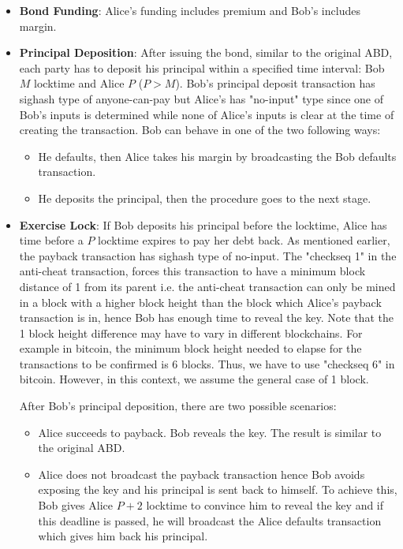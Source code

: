 \begin{itemize}
    \item \textbf{Bond Funding}: Alice's funding includes premium and Bob's includes margin.
    
    \item \textbf{Principal Deposition}: 
        After issuing the bond, similar to the original ABD, each party has to deposit his principal within a specified time interval: Bob $M$ locktime and Alice $P$ ($P > M$). Bob's principal deposit transaction has sighash type of anyone-can-pay but Alice's has "no-input" type since one of Bob's inputs is determined while none of Alice's inputs is clear at the time of creating the transaction. Bob can behave in one of the two following ways:
    \begin{itemize}
        \item He defaults, then Alice takes his margin by broadcasting the Bob defaults transaction.
        \item He deposits the principal, then the procedure goes to the next stage.
    \end{itemize}
    
    \item \textbf{Exercise Lock}: If Bob deposits his principal before the locktime, Alice has time before a $P$ locktime expires to pay her debt back. As mentioned earlier, the payback transaction has sighash type of no-input. The "checkseq 1" in the anti-cheat transaction, forces this transaction to have a minimum block distance of 1 from its parent i.e. the anti-cheat transaction can only be mined in a block with a higher block height than the block which Alice's payback transaction is in, hence Bob has enough time to reveal the \keyone key. Note that the 1 block height difference may have to vary in different blockchains. For example in bitcoin, the minimum block height needed to elapse for the transactions to be confirmed is 6 blocks. Thus, we have to use "checkseq 6" in bitcoin. However, in this context, we assume the general case of 1 block.
    
    After Bob's principal deposition, there are two possible scenarios: 
    \begin{itemize}
        \item Alice succeeds to payback. Bob reveals the \keyone key. The result is similar to the original ABD. 
        
        \item Alice does not broadcast the payback transaction hence Bob avoids exposing the \keyone key and his principal is sent back to himself. To achieve this, Bob gives Alice $P + 2$ locktime to convince him to reveal the \keyone key and if this deadline is passed, he will broadcast the Alice defaults transaction which gives him back his principal.
        

\end{itemize}
\end{itemize}
